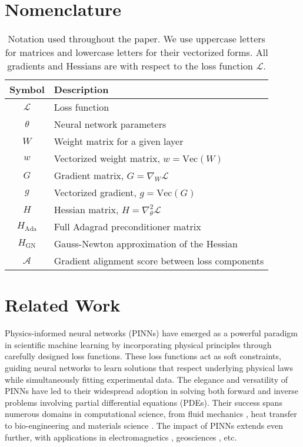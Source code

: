 
\section{Nomenclature}

\begin{table}[H]
    \renewcommand{\arraystretch}{1.4}
\centering
\caption{Notation used throughout the paper. We use uppercase letters for matrices and lowercase letters for their vectorized forms. All gradients and Hessians are with respect to the loss function $\mathcal{L}$.}
\label{tab:notation}
\begin{tabular}{c|l}
\toprule
\textbf{Symbol} & \textbf{Description} \\
\midrule
$\mathcal{L}$ & Loss function \\
$\theta$ & Neural network parameters \\
$W$ & Weight matrix for a given layer \\
$w$ & Vectorized weight matrix, $w = \text{Vec}(W)$ \\
$G$ & Gradient matrix, $G = \nabla_W \mathcal{L}$ \\
$g$ & Vectorized gradient, $g = \text{Vec}(G)$ \\
$H$ & Hessian matrix, $H = \nabla^2_\theta \mathcal{L}$ \\
$H_{\text{Ada}}$ & Full Adagrad preconditioner matrix \\
$H_{\text{GN}}$ & Gauss-Newton approximation of the Hessian \\
$\mathcal{A}$ & Gradient alignment score between loss components \\
\bottomrule
\end{tabular}

\end{table}


\section{Related Work} 
\label{sec: related_work}

Physics-informed neural networks (PINNs) have emerged as a powerful paradigm in scientific machine learning by incorporating physical principles through carefully designed loss functions. These loss functions act as soft constraints, guiding neural networks to learn solutions that respect underlying physical laws while simultaneously fitting experimental data. The elegance and versatility of PINNs have led to their widespread adoption in solving both forward and inverse problems involving partial differential equations (PDEs). Their success spans numerous domains in computational science, from fluid mechanics \cite{raissi2020hidden,almajid2022prediction,eivazi2022physics,cao2024surrogate}, heat transfer \cite{xu2023physics,bararnia2022application,gokhale2022physics} to bio-engineering \cite{kissas2020machine,zhang2023physics,caforio2024physics} and materials science \cite{zhang2022analyses,jeong2023physics, hu2024physics}. The impact of PINNs extends even further, with applications in electromagnetics \cite{kovacs2022conditional,khan2022physics,baldan2023physics}, geosciences \cite{smith2022hyposvi, song2023simulating,ren2024seismicnet}, etc.


